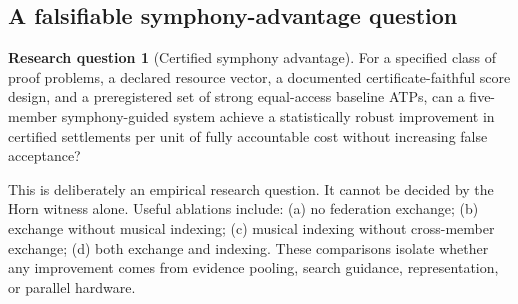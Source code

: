 \documentclass[11pt,letterpaper]{article}
\theoremstyle{definition}
\newtheorem{question}[theorem]{Research question}
\theoremstyle{remark}
\begin{document}
\subsection{A falsifiable symphony-advantage question}
\begin{question}[Certified symphony advantage]
For a specified class of proof problems, a declared resource vector, a documented certificate-faithful score design, and a preregistered set of strong equal-access baseline ATPs, can a five-member symphony-guided system achieve a statistically robust improvement in certified settlements per unit of fully accountable cost without increasing false acceptance?
\end{question}

This is deliberately an empirical research question. It cannot be decided by the Horn witness alone. Useful ablations include: (a) no federation exchange; (b) exchange without musical indexing; (c) musical indexing without cross-member exchange; (d) both exchange and indexing. These comparisons isolate whether any improvement comes from evidence pooling, search guidance, representation, or parallel hardware.
\end{document}
